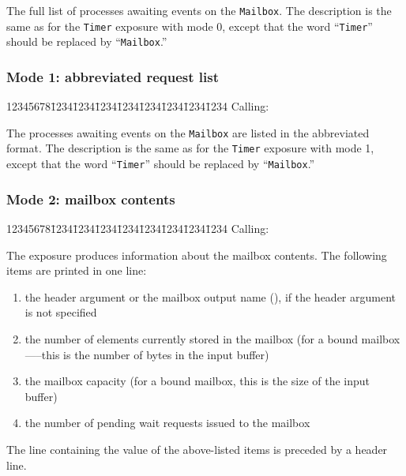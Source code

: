 The full list of processes awaiting events on the {\tt Mailbox}.
The description is the same as for the {\tt Timer} exposure
with mode 0, except that the word ``{\tt Timer}'' should be replaced by
``{\tt Mailbox}.''

\subsubsection*{Mode 1: abbreviated request list}

{\tt\begin{tabbing}
12345678\=1234\=1234\=1234\=1234\=1234\=1234\=1234\=1234\kill
{\rm Calling:}
\end{tabbing}}

The processes awaiting events on the {\tt Mailbox} are listed in the
abbreviated format.
The description is the same as for the {\tt Timer} exposure
with mode 1, except that the word ``{\tt Timer}'' should be replaced by
``{\tt Mailbox}.''

\subsubsection*{Mode 2: mailbox contents}

{\tt\begin{tabbing}
12345678\=1234\=1234\=1234\=1234\=1234\=1234\=1234\=1234\kill
{\rm Calling:}
\end{tabbing}}

The exposure produces information about the mailbox contents.
The following items are printed in one line:

\begin{enumerate}
\item
the header argument or the mailbox output name (), if the
header argument is not specified
\item
the number of elements currently stored in the mailbox
(for a bound mailbox-----this is the number of bytes
in the input buffer)
\item
the mailbox capacity (for a bound mailbox, this is the size of the input
buffer)
\item
the number of pending wait requests issued to the mailbox
\end{enumerate}

The line containing the value of the above-listed items is preceded by a
header line.

